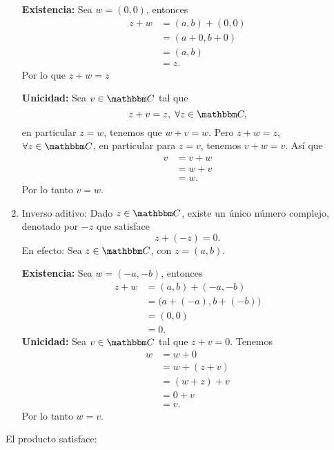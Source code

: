 \begin{enumerate}[label=A\arabic*.]
    \textbf{Existencia:} Sea $w=(0,  0)$, entonces
    \begin{align*}
        z+w & = (a,  b)+(0,  0) \\
        & = (a+0,  b+0) \\
        & = (a,  b) \\
        & = z.
    \end{align*}
    Por lo que $z+w=z$
    
    \textbf{Unicidad:} Sea $v \in \CC$ tal que
    $$z+v=z, \; \forall z \in \CC,$$
    en particular $z=w$, tenemos que $w+v=w$. Pero $z+w=z$, $\forall z \in \CC$, en particular para $z=v$, tenemos $v+w=v$. Así que
    \begin{align*}
        v & = v+w \\
        & = w+v \\
        & = w.
    \end{align*}
    Por lo tanto $v=w$.\newpage
    \item Inverso aditivo: Dado $z \in \CC$, existe un único número complejo, denotado por $-z$ que satisface
    $$z+(-z)=0.$$
    En efecto: Sea $z \in \CC$, con $z=(a,  b)$.
    
    \textbf{Existencia:} Sea $w=(-a,  -b)$, entonces
    \begin{align*}
        z+w &=(a,  b)+(-a,  -b) \\
        &=\big( a+(-a),  b+(-b) \big) \\
        &=(0,  0) \\
        & = 0.
    \end{align*}
    \textbf{Unicidad:} Sea $v \in \CC$ tal que $z+v=0$. Tenemos
    \begin{align*}
        w &=w+0 \\
        &=w+(z+v) \\
        &=(w+z)+v \\
        &=0+v \\
        &=v.
    \end{align*}
    Por lo tanto $w=v$.
\end{enumerate}
El producto satisface:
